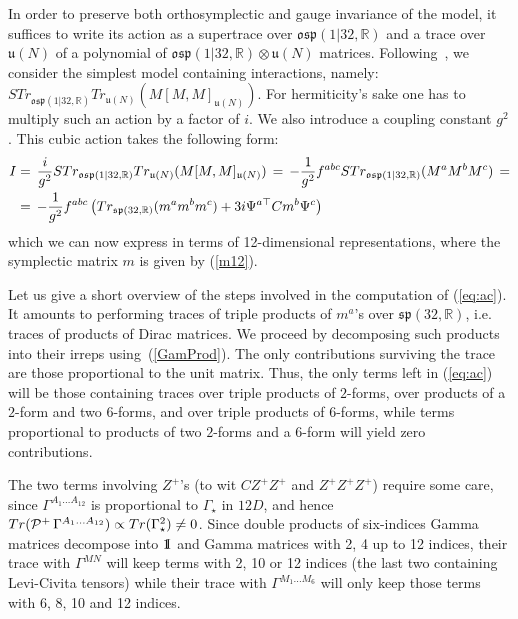 \documentclass[a4paper,11pt]{article}
\def\Id{{\rm 1\kern-.28em I}}
\begin{document}
In order to preserve both orthosymplectic and gauge invariance of the model, it suffices to write
its action as a supertrace over $\mathfrak{osp}(1|32,\mathbb{R})$ and a trace over $\mathfrak{u}(N)$ 
of a polynomial of $\mathfrak{osp}(1|32,\mathbb{R})\otimes\mathfrak{u}(N)$ matrices. 
Following~\cite{Smo1}, we consider the simplest model containing interactions, namely:\linebreak 
$STr_{\mathfrak{osp}(1|32,\mathbb{R})} Tr_{\mathfrak{u}(N)} (M[M,M]_{\mathfrak{u}(N)})$. 
For hermiticity's sake one has to multiply such an action by a factor of $i$.
We also introduce a coupling constant $g^2$. This cubic action takes the following form:
\begin{align}\label{eq:ac}
I&=\,\frac{i}{g^2} STr_{\mathfrak{osp}(1|32,\mathbb{R})} Tr_{\mathfrak{u}(N)} (M[M,M]_{\mathfrak{u}(N)})\,=\,
-\frac{1}{g^2}f^{abc}STr_{\mathfrak{osp}(1|32,\mathbb{R})}(M^a M^b M^c)\,=
\\
&=\,-\frac{1}{g^2}f^{abc}\left(Tr_{\mathfrak{sp}(32,\mathbb{R})}(m^a m^b m^c)+3i \Psi^{a\top} C m^b \Psi^c\right)\notag
\end{align}
which we can now express in terms of 12-dimensional representations,
where the symplectic matrix $m$ is given by (\ref{m12}).

Let us give a short overview of the steps involved in the computation of (\ref{eq:ac}). 
It amounts to performing traces of triple products of  $m^a$'s over $\mathfrak{sp}(32,\mathbb{R})$, i.e.
traces of products of Dirac matrices. We proceed by decomposing such products into their irreps using~(\ref{GamProd}).
The only contributions surviving the trace are those proportional to the unit matrix. 
Thus, the only terms left in (\ref{eq:ac}) will be those containing traces over triple products of $2$-forms, 
over products of a $2$-form and two $6$-forms, and over  triple products of $6$-forms, while
terms proportional to products of two $2$-forms and a $6$-form will yield zero contributions.

The two terms involving $Z^+$'s (to wit $CZ^+Z^+$ and $Z^+Z^+Z^+$) require some care, since 
$\Gamma^{A_1\ldots A_{12}}$ is proportional to $\Gamma_{\star}$ in $12D$, and hence 
$Tr({\cal P}^+\,\Gamma^{A_1\ldots A_{12}})\propto Tr(\Gamma^2_{\star})\neq 0$. 
Since double products of six-indices Gamma matrices decompose into $\Id$ and Gamma matrices with
2, 4 up to 12 indices, their trace with $\Gamma^{MN}$ will keep terms with 2, 10
or 12 indices (the last two containing Levi-Civita tensors) while their trace with $\Gamma^{M_1 \dots M_6}$   
will only keep those terms with 6, 8, 10 and 12 indices.
\end{document}
